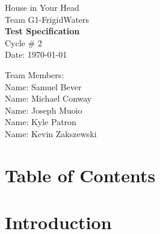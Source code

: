 \documentclass{article}
\begin{document}
\begin{titlepage}
    \begin{center}
        \begin{huge}
        House in Your Head \\[1cm]
        Team G1-FrigidWaters \\[2.2cm]
        { \bfseries Test Specification } \\[1cm]
        Cycle \# 2\\[2.2cm]
        Date: \required\today\\[1cm]
        \end{huge}
    \end{center}
    \null \vfill
    \begin{large}
        Team Members: \\[0.5cm]
        Name: Samuel Bever\\[0.5cm]
        Name: Michael Conway\\[0.5cm]
        Name: Joseph Muoio\\[0.5cm]
        Name: Kyle Patron\\[0.5cm]
        Name: Kevin Zakszewski
    \end{large}
\end{titlepage}
\section*{\centering Table of Contents}
\makeatletter
{}
\newcommand{\hsubsubsection}{
\@startsection{subsubsection}{3}{\z@}%
                                     {-3.25ex\@plus -1ex \@minus -.2ex}%
                                     {-1.5ex \@plus -.2ex}%
                                     {R\normalfont\normalsize}}
\newcommand{\hparagraph}{
\@startsection{paragraph}{4}{\z@}%
                                     {-3.25ex\@plus -1ex \@minus -.2ex}%
                                     {-1.5ex \@plus -.2ex}%
                                     {R\normalfont\normalsize}}
\newcommand{\hsubparagraph}{
\@startsection{subparagraph}{5}{\z@}%
                                     {-3.25ex\@plus -1ex \@minus -.2ex}%
                                     {-1.5ex \@plus -.2ex}%
                                     {R\normalfont\normalsize}}
\setcounter{secnumdepth}{5}
\makeatother
\newpage
 

\section{Introduction}
\end{document}
